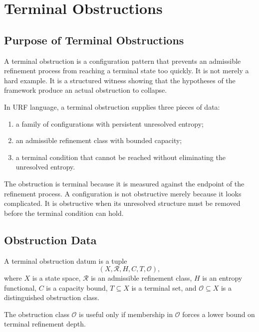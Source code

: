 \chapter{Terminal Obstructions}

\section{Purpose of Terminal Obstructions}

A terminal obstruction is a configuration pattern that prevents an admissible
refinement process from reaching a terminal state too quickly. It is not merely
a hard example. It is a structured witness showing that the hypotheses of the
framework produce an actual obstruction to collapse.

In URF language, a terminal obstruction supplies three pieces of data:

\begin{enumerate}
\item a family of configurations with persistent unresolved entropy;
\item an admissible refinement class with bounded capacity;
\item a terminal condition that cannot be reached without eliminating the
unresolved entropy.
\end{enumerate}

The obstruction is terminal because it is measured against the endpoint of the
refinement process. A configuration is not obstructive merely because it looks
complicated. It is obstructive when its unresolved structure must be removed
before the terminal condition can hold.

\section{Obstruction Data}

\begin{definition}
A terminal obstruction datum is a tuple
\[
(X,\mathcal R,H,C,T,\mathcal O),
\]
where \(X\) is a state space, \(\mathcal R\) is an admissible refinement class,
\(H\) is an entropy functional, \(C\) is a capacity bound, \(T\subseteq X\) is
a terminal set, and \(\mathcal O\subseteq X\) is a distinguished obstruction
class.
\end{definition}

The obstruction class \(\mathcal O\) is useful only if membership in
\(\mathcal O\) forces a lower bound on terminal refinement depth.

